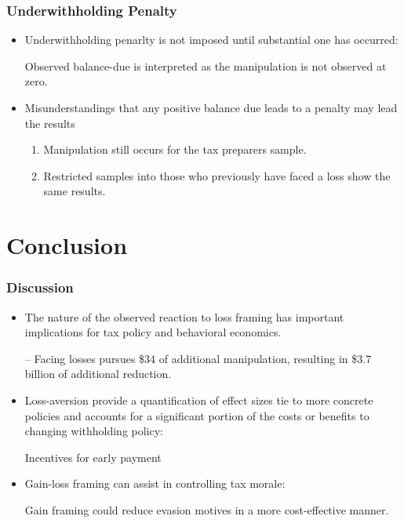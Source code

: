 \documentclass[dvipdfmx,12pt]{beamer}
\begin{document}
\begin{frame}\frametitle{Underwithholding Penalty}
  \begin{itemize}
    \item Underwithholding penarlty is not imposed until substantial one has occurred:

    Observed balance-due is interpreted as the manipulation is not observed at zero.

    \item Misunderstandings that any positive balance due leads to a penalty may lead the results
    \begin{enumerate}
      \item Manipulation still occurs for the tax preparers sample.

      \item Restricted samples into those who previously have faced a loss show the same results.
    \end{enumerate}
  \end{itemize}
\end{frame}

\section{Conclusion}
\begin{frame}\frametitle{Discussion}
  \begin{itemize}
    \item The nature of the observed reaction to loss framing has important implications for tax policy and behavioral economics.

    -- Facing losses pursues \$34 of additional manipulation, resulting in \$3.7 billion of additional reduction.

    \item Loss-aversion  provide a quantification of effect sizes tie to more concrete policies and accounts for a significant portion of the costs or benefits to changing withholding policy:

    Incentives for early payment %

    \item Gain-loss framing can assist in controlling tax morale:

    Gain framing could reduce evasion motives in a more cost-effective manner.
  \end{itemize}
\end{frame}
\end{document}
